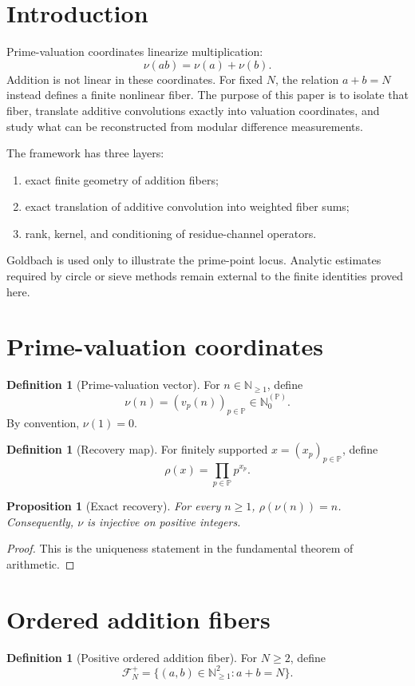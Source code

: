\documentclass[11pt]{article}
\newtheorem{proposition}[theorem]{Proposition}
\theoremstyle{definition}
\newtheorem{definition}[theorem]{Definition}
\newcommand{\N}{\mathbb N}
\newcommand{\Pp}{\mathbb P}
\newcommand{\F}{\mathcal F}
\begin{document}
\tableofcontents
\newpage

\section{Introduction}
Prime-valuation coordinates linearize multiplication:
\[
\nu(ab)=\nu(a)+\nu(b).
\]
Addition is not linear in these coordinates. For fixed $N$, the relation $a+b=N$ instead defines a finite nonlinear fiber. The purpose of this paper is to isolate that fiber, translate additive convolutions exactly into valuation coordinates, and study what can be reconstructed from modular difference measurements.

The framework has three layers:
\begin{enumerate}
\item exact finite geometry of addition fibers;
\item exact translation of additive convolution into weighted fiber sums;
\item rank, kernel, and conditioning of residue-channel operators.
\end{enumerate}
Goldbach is used only to illustrate the prime-point locus. Analytic estimates required by circle or sieve methods remain external to the finite identities proved here.

\section{Prime-valuation coordinates}
\begin{definition}[Prime-valuation vector]
For $n\in\N_{\ge1}$, define
\[
\nu(n)=(v_p(n))_{p\in\Pp}\in\N_0^{(\Pp)}.
\]
By convention, $\nu(1)=0$.
\end{definition}

\begin{definition}[Recovery map]
For finitely supported $x=(x_p)_{p\in\Pp}$, define
\[
\rho(x)=\prod_{p\in\Pp}p^{x_p}.
\]
\end{definition}

\begin{proposition}[Exact recovery]
For every $n\ge1$, $\rho(\nu(n))=n$. Consequently, $\nu$ is injective on positive integers.
\end{proposition}
\begin{proof}
This is the uniqueness statement in the fundamental theorem of arithmetic.
\end{proof}

\section{Ordered addition fibers}
\begin{definition}[Positive ordered addition fiber]
For $N\ge2$, define
\[
\F_N^+=\{(a,b)\in\N_{\ge1}^2:a+b=N\}.
\]
\end{definition}
\end{document}
